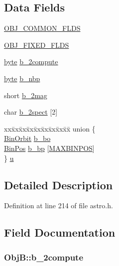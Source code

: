 \subsection*{Data Fields}
\begin{DoxyCompactItemize}
\item 
\hyperlink{struct_obj_b_a1a35d318e044b682941c0030c856dbed}{O\-B\-J\-\_\-\-C\-O\-M\-M\-O\-N\-\_\-\-F\-L\-D\-S}
\item 
\hyperlink{struct_obj_b_aa756c8c241e67339e273e8d3a5215e1c}{O\-B\-J\-\_\-\-F\-I\-X\-E\-D\-\_\-\-F\-L\-D\-S}
\item 
\hyperlink{astro_8h_a0c8186d9b9b7880309c27230bbb5e69d}{byte} \hyperlink{struct_obj_b_a88427754346c50b349a50d472946644b}{b\-\_\-2compute}
\item 
\hyperlink{astro_8h_a0c8186d9b9b7880309c27230bbb5e69d}{byte} \hyperlink{struct_obj_b_a3314e81ed5e1a63b2bc9c91aa05161fe}{b\-\_\-nbp}
\item 
short \hyperlink{struct_obj_b_a16a3be87a937ea9c4387056771aa0add}{b\-\_\-2mag}
\item 
char \hyperlink{struct_obj_b_a4e3335adf18f2b6140f6f92e3e78a350}{b\-\_\-2spect} \mbox{[}2\mbox{]}
\item 
\begin{tabbing}
xx\=xx\=xx\=xx\=xx\=xx\=xx\=xx\=xx\=\kill
union \{\\
\>\hyperlink{struct_bin_orbit}{BinOrbit} \hyperlink{struct_obj_b_a5bc226e04f07466871691875560c91a9}{b\_bo}\\
\>\hyperlink{struct_bin_pos}{BinPos} \hyperlink{struct_obj_b_a7511eaac1e5e7c4f30ebb1cc5ba546a2}{b\_bp} \mbox{[}\hyperlink{astro_8h_ae71358c16a25f35949f4b21cb745790f}{MAXBINPOS}\mbox{]}\\
\} \hyperlink{struct_obj_b_a5a002e40b447bb980bb3375c58ab7d48}{u}\\

\end{tabbing}\end{DoxyCompactItemize}


\subsection{Detailed Description}


Definition at line 214 of file astro.\-h.



\subsection{Field Documentation}
\hypertarget{struct_obj_b_a88427754346c50b349a50d472946644b}{
\subsubsection[{b\-\_\-2compute}]{ Obj\-B\-::b\-\_\-2compute}}\label{struct_obj_b_a88427754346c50b349a50d472946644b}


